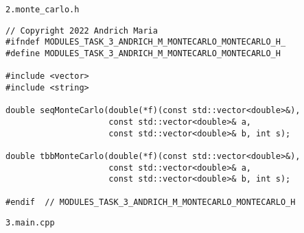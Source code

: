\documentclass{report}
\begin{document}
\par \verb|2.monte_carlo.h|
\begin{lstlisting}
// Copyright 2022 Andrich Maria
#ifndef MODULES_TASK_3_ANDRICH_M_MONTECARLO_MONTECARLO_H_
#define MODULES_TASK_3_ANDRICH_M_MONTECARLO_MONTECARLO_H

#include <vector>
#include <string>

double seqMonteCarlo(double(*f)(const std::vector<double>&),
                     const std::vector<double>& a,
                     const std::vector<double>& b, int s);

double tbbMonteCarlo(double(*f)(const std::vector<double>&),
                     const std::vector<double>& a,
                     const std::vector<double>& b, int s);

#endif  // MODULES_TASK_3_ANDRICH_M_MONTECARLO_MONTECARLO_H
\end{lstlisting}
\par \verb|3.main.cpp|
\end{document}
